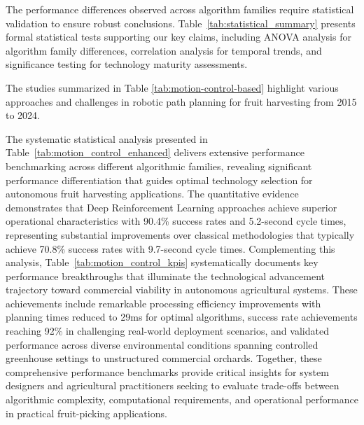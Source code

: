 \documentclass{ieeeaccess}
\begin{document}
The performance differences observed across algorithm families require statistical validation to ensure robust conclusions. Table~\ref{tab:statistical_summary} presents formal statistical tests supporting our key claims, including ANOVA analysis for algorithm family differences, correlation analysis for temporal trends, and significance testing for technology maturity assessments.




The studies summarized in Table \ref{tab:motion-control-based} highlight various approaches and challenges in robotic path planning for fruit harvesting from 2015 to 2024.

The systematic statistical analysis presented in Table~\ref{tab:motion_control_enhanced} delivers extensive performance benchmarking across different algorithmic families, revealing significant performance differentiation that guides optimal technology selection for autonomous fruit harvesting applications. The quantitative evidence demonstrates that Deep Reinforcement Learning approaches achieve superior operational characteristics with 90.4\% success rates and 5.2-second cycle times, representing substantial improvements over classical methodologies that typically achieve 70.8\% success rates with 9.7-second cycle times. Complementing this analysis, Table~\ref{tab:motion_control_kpis} systematically documents key performance breakthroughs that illuminate the technological advancement trajectory toward commercial viability in autonomous agricultural systems. These achievements include remarkable processing efficiency improvements with planning times reduced to 29ms for optimal algorithms, success rate achievements reaching 92\% in challenging real-world deployment scenarios, and validated performance across diverse environmental conditions spanning controlled greenhouse settings to unstructured commercial orchards. Together, these comprehensive performance benchmarks provide critical insights for system designers and agricultural practitioners seeking to evaluate trade-offs between algorithmic complexity, computational requirements, and operational performance in practical fruit-picking applications.
\end{document}
